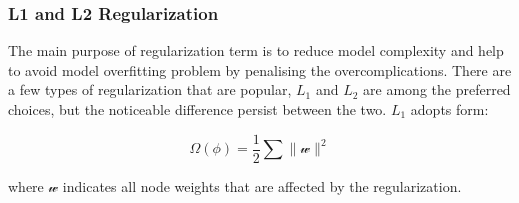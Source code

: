 \subsubsection{L1 and L2 Regularization}

The main purpose of regularization term is to reduce model complexity and help to avoid model overfitting problem by penalising the overcomplications. There are a few types of regularization that are popular, $L_1$ and $L_2$ are among the preferred choices, but the noticeable difference persist between the two. $L_1$ adopts form:

\begin{equation}
   \Omega(\phi) = \frac {1}{2} \sum \parallel \mathcal{w} \parallel^2
\end{equation}

where $\mathcal{w}$ indicates all node weights that are affected by the regularization. 
